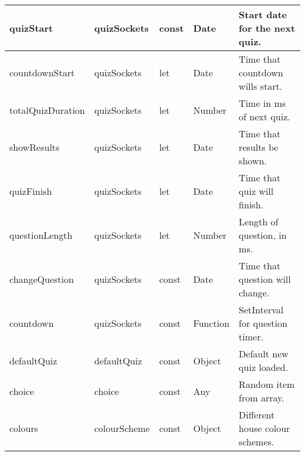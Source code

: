 \begin{table}[]
\begin{tabular}{|l|l|l|l|l|}
quizStart                           & quizSockets                          & const                              & Date                                 & Start date for the next quiz.         \\ \hline
countdownStart                      & quizSockets                          & let                                & Date                                 & Time that countdown wills start.      \\ \hline
totalQuizDuration                   & quizSockets                          & let                                & Number                               & Time in ms of next quiz.              \\ \hline
showResults                         & quizSockets                          & let                                & Date                                 & Time that results be shown.           \\ \hline
quizFinish                          & quizSockets                          & let                                & Date                                 & Time that quiz will finish.           \\ \hline
questionLength                      & quizSockets                          & let                                & Number                               & Length of question, in ms.            \\ \hline
changeQuestion                      & quizSockets                          & const                              & Date                                 & Time that question will change.       \\ \hline
countdown                           & quizSockets                          & const                              & Function                             & SetInterval for question timer.       \\ \hline
defaultQuiz                         & defaultQuiz                          & const                              & Object                               & Default new quiz loaded.              \\ \hline
choice                              & choice                               & const                              & Any                                  & Random item from array.               \\ \hline
colours                             & colourScheme                         & const                              & Object                               & Different house colour schemes.       \\ \hline

\end{tabular}
\end{table}
